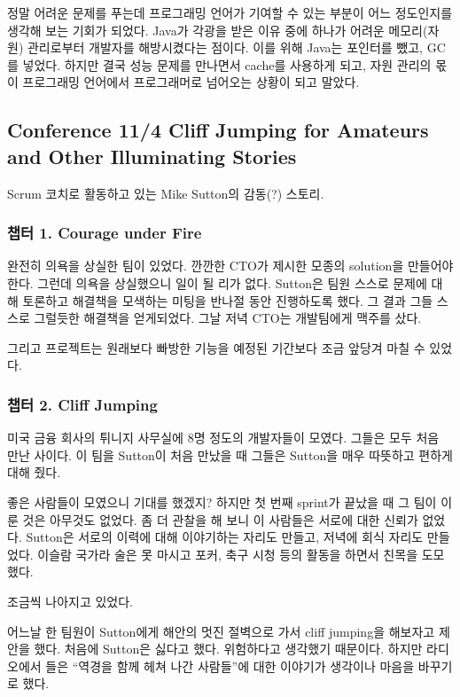\documentclass[a4paper]{article}
\begin{document}
정말 어려운 문제를 푸는데 프로그래밍 언어가 기여할 수 있는 부분이 어느 
정도인지를 생각해 보는 기회가 되었다. 
Java가 각광을 받은 이유 중에 하나가 어려운 메모리(자원) 관리로부터 개발자를 
해방시켰다는 점이다. 이를 위해 Java는 포인터를 뺐고, GC를 넣었다. 
하지만 결국 성능 문제를 만나면서 cache를 사용하게 되고, 자원 관리의 몫이 
프로그래밍 언어에서 프로그래머로 넘어오는 상황이 되고 말았다.

\subsection{Conference 11/4 Cliff Jumping for Amateurs and Other
  Illuminating Stories}
 
Scrum 코치로 활동하고 있는 Mike Sutton의 감동(?) 스토리.
 
\subsubsection{챕터 1. Courage under Fire}
 
완전히 의욕을 상실한 팀이 있었다. 깐깐한 CTO가 제시한 모종의 solution을
만들어야 한다.  그런데 의욕을 상실했으니 일이 될 리가 없다. Sutton은
팀원 스스로 문제에 대해 토론하고 해결책을 모색하는 미팅을 반나절 동안
진행하도록 했다. 그 결과 그들 스스로 그럴듯한 해결책을 얻게되었다. 그날
저녁 CTO는 개발팀에게 맥주를 샀다.
 
그리고 프로젝트는 원래보다 빠방한 기능을 예정된 기간보다 조금 앞당겨 마칠 수 
있었다.
 
\subsubsection{챕터 2. Cliff Jumping}
 
미국 금융 회사의 튀니지 사무실에 8명 정도의 개발자들이 모였다. 그들은
모두 처음 만난 사이다.  이 팀을 Sutton이 처음 만났을 때 그들은 Sutton을
매우 따뜻하고 편하게 대해 줬다.
 
좋은 사람들이 모였으니 기대를 했겠지? 하지만 첫 번째 sprint가 끝났을 때
그 팀이 이룬 것은 아무것도 없었다. 좀 더 관찰을 해 보니 이 사람들은
서로에 대한 신뢰가 없었다. Sutton은 서로의 이력에 대해 이야기하는
자리도 만들고, 저녁에 회식 자리도 만들었다. 이슬람 국가라 술은 못
마시고 포커, 축구 시청 등의 활동을 하면서 친목을 도모했다.
 
조금씩 나아지고 있었다.
 
어느날 한 팀원이 Sutton에게 해안의 멋진 절벽으로 가서 cliff jumping을
해보자고 제안을 했다. 처음에 Sutton은 싫다고 했다. 위험하다고 생각했기
때문이다.  하지만 라디오에서 들은 ``역경을 함께 헤쳐 나간 사람들''에 대한
이야기가 생각이나 마음을 바꾸기로 했다.
 
\end{document}
